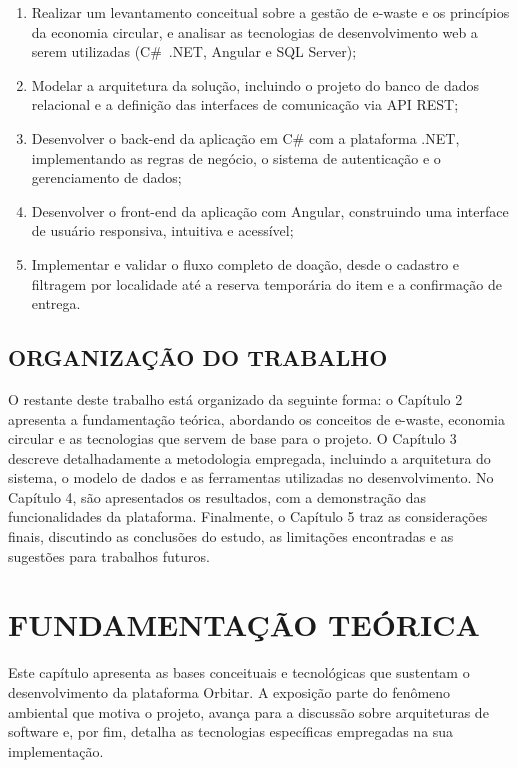\documentclass[
	12pt,				%
	openright,			%
	oneside,			%
	a4paper,			%
	english,			%
	brazil				%
	]{abntex2}
\theoremstyle{definition}
\begin{document}
\begin{enumerate}[label={\alph*}]
    \item Realizar um levantamento conceitual sobre a gestão de e-waste e os princípios da economia circular, e analisar as tecnologias de desenvolvimento web a serem utilizadas (C\#\, .NET, Angular e SQL Server);
    \item Modelar a arquitetura da solução, incluindo o projeto do banco de dados relacional e a definição das interfaces de comunicação via API REST;
    \item Desenvolver o back-end da aplicação em C\# com a plataforma .NET, implementando as regras de negócio, o sistema de autenticação e o gerenciamento de dados;
    \item Desenvolver o front-end da aplicação com Angular, construindo uma interface de usuário responsiva, intuitiva e acessível;
    \item Implementar e validar o fluxo completo de doação, desde o cadastro e filtragem por localidade até a reserva temporária do item e a confirmação de entrega.
\end{enumerate}

\section[ORGANIZAÇÃO DO TRABALHO]{ORGANIZAÇÃO DO TRABALHO}

O restante deste trabalho está organizado da seguinte forma: o Capítulo 2 apresenta a fundamentação teórica, abordando os conceitos de e-waste, economia circular e as tecnologias que servem de base para o projeto. O Capítulo 3 descreve detalhadamente a metodologia empregada, incluindo a arquitetura do sistema, o modelo de dados e as ferramentas utilizadas no desenvolvimento. No Capítulo 4, são apresentados os resultados, com a demonstração das funcionalidades da plataforma. Finalmente, o Capítulo 5 traz as considerações finais, discutindo as conclusões do estudo, as limitações encontradas e as sugestões para trabalhos futuros.

\chapter[FUNDAMENTAÇÃO TEÓRICA]{FUNDAMENTAÇÃO TEÓRICA}

Este capítulo apresenta as bases conceituais e tecnológicas que sustentam o desenvolvimento da plataforma Orbitar. A exposição parte do fenômeno ambiental que motiva o projeto, avança para a discussão sobre arquiteturas de software e, por fim, detalha as tecnologias específicas empregadas na sua implementação.
\end{document}
